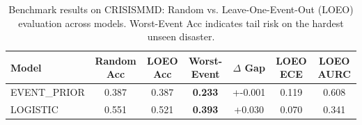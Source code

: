 \begin{table}[t]
\centering
\caption{Benchmark results on CRISISMMD: Random vs. Leave-One-Event-Out (LOEO) evaluation across models. Worst-Event Acc indicates tail risk on the hardest unseen disaster.}
\label{tab:benchmark_crisismmd}
\begin{tabular}{lcccccc}
\toprule
\textbf{Model} & \textbf{Random Acc} & \textbf{LOEO Acc} & \textbf{Worst-Event} & $\Delta$ \textbf{Gap} & \textbf{LOEO ECE} & \textbf{LOEO AURC} \\
\midrule
EVENT_PRIOR & 0.387 & 0.387 & \textbf{0.233} & +-0.001 & 0.119 & 0.608 \\
LOGISTIC & 0.551 & 0.521 & \textbf{0.393} & +0.030 & 0.070 & 0.341 \\
\bottomrule
\end{tabular}
\end{table}
